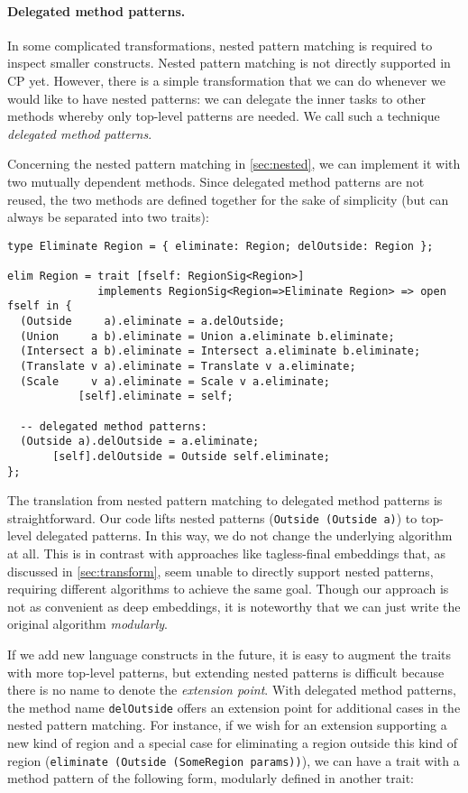 \paragraph{Delegated method patterns.}
In some complicated transformations, nested pattern matching is required to
inspect smaller constructs. Nested pattern matching is not directly supported in
CP yet. However, there is a simple transformation that we can do whenever we
would like to have nested patterns:  we can delegate the inner tasks to other
methods whereby only top-level patterns are needed. We call such a technique
\emph{delegated method patterns}.

Concerning the nested pattern matching in \autoref{sec:nested}, we can implement
it with two mutually dependent methods. Since delegated method patterns are not
reused, the two methods are defined together for the sake of simplicity (but can
always be separated into two traits):

\begin{lstlisting}
type Eliminate Region = { eliminate: Region; delOutside: Region };

elim Region = trait [fself: RegionSig<Region>]
              implements RegionSig<Region=>Eliminate Region> => open fself in {
  (Outside     a).eliminate = a.delOutside;
  (Union     a b).eliminate = Union a.eliminate b.eliminate;
  (Intersect a b).eliminate = Intersect a.eliminate b.eliminate;
  (Translate v a).eliminate = Translate v a.eliminate;
  (Scale     v a).eliminate = Scale v a.eliminate;
           [self].eliminate = self;

  -- delegated method patterns:
  (Outside a).delOutside = a.eliminate;
       [self].delOutside = Outside self.eliminate;
};
\end{lstlisting}

\noindent The translation from nested pattern matching to delegated method
patterns is straightforward. Our code lifts nested patterns
(\lstinline{Outside (Outside a)}) to top-level delegated patterns. In this way,
we do not change the underlying algorithm at all. This is in contrast with
approaches like tagless-final embeddings that, as discussed in
\autoref{sec:transform}, seem unable to directly support nested patterns,
requiring different algorithms to achieve the same goal. Though our approach is
not as convenient as deep embeddings, it is noteworthy that we can just write
the original algorithm \emph{modularly}.

If we add new language constructs in the future, it is easy to augment the
traits with more top-level patterns, but extending nested patterns is difficult
because there is no name to denote the \emph{extension point}. With delegated
method patterns, the method name \lstinline{delOutside} offers an extension
point for additional cases in the nested pattern matching. For instance, if we
wish for an extension supporting a new kind of region and a special case for
eliminating a region outside this kind of region
(\lstinline{eliminate (Outside (SomeRegion params))}), we can have a trait with
a method pattern of the following form, modularly defined in another trait:

